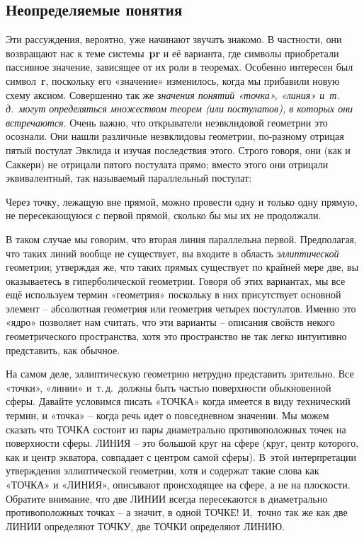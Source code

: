 \documentclass[../main.tex]{subfiles}
\begin{document}
\subsection{Неопределяемые понятия}

Эти рассуждения, вероятно, уже начинают звучать знакомо. В частности, они возвращают нас к теме системы~\textbf{pr} и её варианта, где символы приобретали пассивное значение, зависящее от их роли в теоремах. Особенно интересен был символ~\textbf{r}, поскольку его «значение» изменилось, когда мы прибавили новую схему аксиом. Совершенно так же з\emph{начения понятий «точка», «линия» и~т.\,д.\ могут определяться множеством теорем (или постулатов), в которых они встречаются}. Очень важно, что открыватели неэвклидовой геометрии это осознали. Они нашли различные неэвклидовы геометрии, по-разному отрицая пятый постулат Эвклида и изучая последствия этого. Строго говоря, они (как и Саккери) не отрицали пятого постулата прямо; вместо этого они отрицали эквивалентный, так называемый параллельный постулат:
%
\begin{block}
Через точку, лежащую вне прямой, можно провести одну и только одну прямую, не пересекающуюся с первой прямой, сколько бы мы их не продолжали.
\end{block}

В таком случае мы говорим, что вторая линия параллельна первой. Предполагая, что таких линий вообще не существует, вы входите в область \emph{эллиптической} геометрии; утверждая же, что таких прямых существует по крайней мере две, вы оказываетесь в гиперболической геометрии. Говоря об этих вариантах, мы все ещё используем термин «геометрия» поскольку в них присутствует основной элемент \--- абсолютная геометрия или геометрия четырех постулатов. Именно это «ядро» позволяет нам считать, что эти варианты \--- описания свойств некого геометрического пространства, хотя это пространство не так легко интуитивно представить, как обычное.

На самом деле, эллиптическую геометрию нетрудно представить зрительно. Все «точки», «линии» и~т.\,д.\ должны быть частью поверхности обыкновенной сферы. Давайте условимся писать «ТОЧКА» когда имеется в виду технический термин, и «точка» \--- когда речь идет о повседневном значении. Мы можем сказать что ТОЧКА состоит из пары диаметрально противоположных точек на поверхности сферы. ЛИНИЯ \--- это большой круг на сфере (круг, центр которого, как и центр экватора, совпадает с центром самой сферы). В~этой интерпретации утверждения эллиптической геометрии, хотя и содержат такие слова как «ТОЧКА» и «ЛИНИЯ», описывают происходящее на сфере, а не на плоскости. Обратите внимание, что две ЛИНИИ всегда пересекаются в диаметрально противоположных точках \--- а значит, в одной ТОЧКЕ! И,~точно так же как две ЛИНИИ определяют ТОЧКУ, две ТОЧКИ определяют ЛИНИЮ\@.
\end{document}
